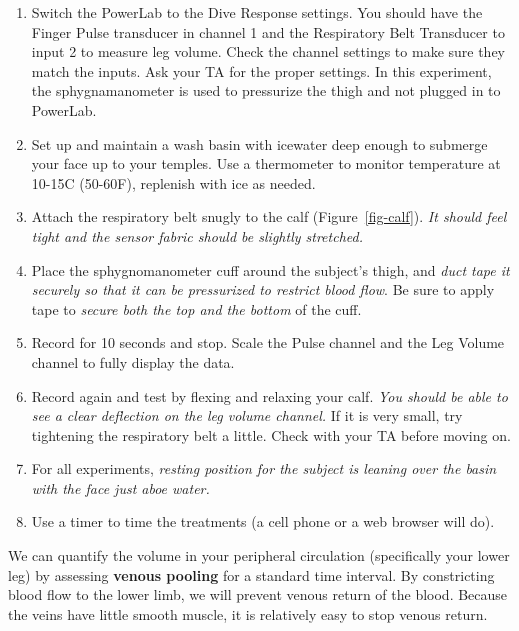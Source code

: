 \documentclass[
  letterpaper,
  DIV=11,
  numbers=noendperiod,
  oneside]{scrartcl}
\providecommand{\tightlist}{%
  \setlength{\itemsep}{0pt}\setlength{\parskip}{0pt}}\usepackage{longtable,booktabs,array}
\begin{document}
\begin{enumerate}
\def\labelenumi{\arabic{enumi}.}
\tightlist
\item
  Switch the PowerLab to the Dive Response settings. You should have the
  Finger Pulse transducer in channel 1 and the Respiratory Belt
  Transducer to input 2 to measure leg volume. Check the channel
  settings to make sure they match the inputs. Ask your TA for the
  proper settings. In this experiment, the sphygnamanometer is used to
  pressurize the thigh and not plugged in to PowerLab.
\item
  Set up and maintain a wash basin with icewater deep enough to submerge
  your face up to your temples. Use a thermometer to monitor temperature
  at 10-15C (50-60F), replenish with ice as needed.
\item
  Attach the respiratory belt snugly to the calf
  (Figure~\ref{fig-calf}). \emph{It should feel tight and the sensor
  fabric should be slightly stretched.}
\item
  Place the sphygnomanometer cuff around the subject's thigh, and
  \emph{duct tape it securely so that it can be pressurized to restrict
  blood flow}. Be sure to apply tape to \emph{secure both the top and
  the bottom} of the cuff.
\item
  Record for 10 seconds and stop. Scale the Pulse channel and the Leg
  Volume channel to fully display the data.
\item
  Record again and test by flexing and relaxing your calf. \emph{You
  should be able to see a clear deflection on the leg volume channel.}
  If it is very small, try tightening the respiratory belt a little.
  Check with your TA before moving on.
\item
  For all experiments, \emph{resting position for the subject is leaning
  over the basin with the face just aboe water.}
\item
  Use a timer to time the treatments (a cell phone or a web browser will
  do).
\end{enumerate}

\begin{tcolorbox}[enhanced jigsaw, opacityback=0, colbacktitle=quarto-callout-note-color!10!white, opacitybacktitle=0.6, colback=white, leftrule=.75mm, title=\textcolor{quarto-callout-note-color}{\faInfo}\hspace{0.5em}{The idea behind measuring peripheral circulation using leg volume
changes}, breakable, rightrule=.15mm, colframe=quarto-callout-note-color-frame, bottomrule=.15mm, bottomtitle=1mm, arc=.35mm, toptitle=1mm, titlerule=0mm, toprule=.15mm, left=2mm, coltitle=black]

We can quantify the volume in your peripheral circulation (specifically
your lower leg) by assessing \textbf{venous pooling} for a standard time
interval. By constricting blood flow to the lower limb, we will prevent
venous return of the blood. Because the veins have little smooth muscle,
it is relatively easy to stop venous return.

\end{tcolorbox}
\end{document}
